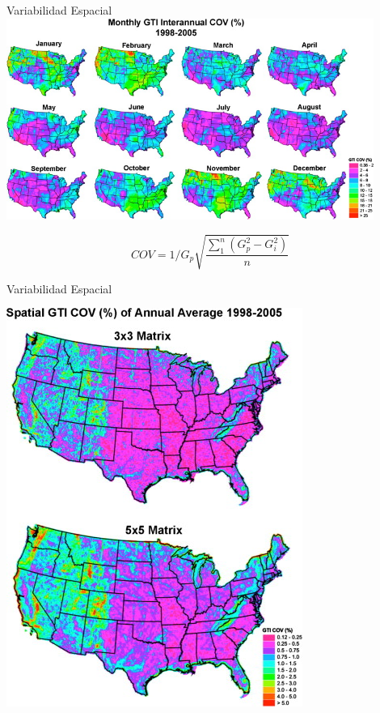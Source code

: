\documentclass[xcolor={usenames,svgnames,dvipsnames}]{beamer}
\begin{document}
\begin{frame}[label=sec-6-1-4]{Variabilidad Espacial}
\includegraphics[width=0.9\textwidth]{../figs/SpatialVariability.jpg}

\[
COV = 1/G_p \sqrt{\frac{\sum_1^{n}(G_p^2 - G_i^2)}{n}}
\]

\nocite{Gueymard.Wilcox2011a}
\end{frame}

\begin{frame}[label=sec-6-1-5]{Variabilidad Espacial}
\begin{center}
\includegraphics[height=0.9\textheight]{../figs/SpatialVariability_Annual.jpg}
\end{center}
\end{frame}
\end{document}
